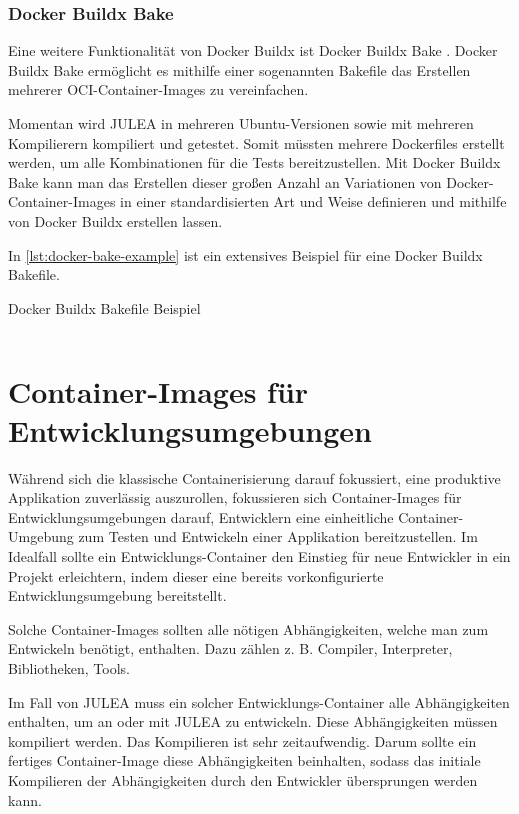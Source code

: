 \subsubsection{Docker Buildx Bake}

Eine weitere Funktionalität von Docker Buildx ist Docker Buildx Bake \cite{dockerBake}. Docker Buildx Bake ermöglicht es mithilfe einer sogenannten Bakefile das Erstellen mehrerer OCI-Container-Images zu vereinfachen.

Momentan wird JULEA in mehreren Ubuntu-Versionen sowie mit mehreren Kompilierern kompiliert und getestet. Somit müssten mehrere Dockerfiles erstellt werden, um alle Kombinationen für die Tests bereitzustellen. Mit Docker Buildx Bake kann man das Erstellen dieser großen Anzahl an Variationen von Docker-Container-Images in einer standardisierten Art und Weise definieren und mithilfe von Docker Buildx erstellen lassen. 

In \cref{lst:docker-bake-example} ist ein extensives Beispiel für eine Docker Buildx Bakefile.

\begin{listing}[H]
    \caption{Docker Buildx Bakefile Beispiel}
    \label{lst:docker-bake-example}
    \inputminted{./lexers/docker-bake-lexer.py}{./code-examples/docker-bake.example.hcl}
\end{listing}

\section{Container-Images für Entwicklungsumgebungen} \label{sec:bg-dev-container}

Während sich die klassische Containerisierung darauf fokussiert, eine produktive Applikation zuverlässig auszurollen, fokussieren sich Container-Images für Entwicklungsumgebungen darauf, Entwicklern eine einheitliche Container-Umgebung zum Testen und Entwickeln einer Applikation bereitzustellen. Im Idealfall sollte ein Entwicklungs-Container den Einstieg für neue Entwickler in ein Projekt erleichtern, indem dieser eine bereits vorkonfigurierte Entwicklungsumgebung bereitstellt.

Solche Container-Images sollten alle nötigen Abhängigkeiten, welche man zum Entwickeln benötigt, enthalten. Dazu zählen z. B. Compiler, Interpreter, Bibliotheken, Tools.

Im Fall von JULEA muss ein solcher Entwicklungs-Container alle Abhängigkeiten enthalten, um an oder mit JULEA zu entwickeln. Diese Abhängigkeiten müssen kompiliert werden. Das Kompilieren ist sehr zeitaufwendig. Darum sollte ein fertiges Container-Image diese Abhängigkeiten beinhalten, sodass das initiale Kompilieren der Abhängigkeiten durch den Entwickler übersprungen werden kann.

